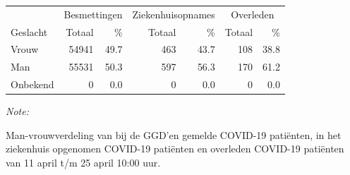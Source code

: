 \documentclass[
  english,
  man,floatsintext]{apa6}
\begin{document}
\begin{table}
\centering\begingroup\fontsize{11}{13}\selectfont

\begin{threeparttable}
\begin{tabular}{lrrrrrr}
\toprule
\multicolumn{1}{c}{ } & \multicolumn{2}{c}{Besmettingen} & \multicolumn{2}{c}{Ziekenhuisopnames} & \multicolumn{2}{c}{Overleden} \\
\cmidrule(l{3pt}r{3pt}){2-3} \cmidrule(l{3pt}r{3pt}){4-5} \cmidrule(l{3pt}r{3pt}){6-7}
Geslacht & Totaal & \% & Totaal & \% & Totaal & \%\\
\midrule
Vrouw & 54941 & 49.7 & 463 & 43.7 & 108 & 38.8\\
Man & 55531 & 50.3 & 597 & 56.3 & 170 & 61.2\\
Onbekend & 0 & 0.0 & 0 & 0.0 & 0 & 0.0\\
\bottomrule
\end{tabular}
\begin{tablenotes}
\item \textit{Note: } 
\item Man-vrouwverdeling van bij de GGD’en gemelde COVID-19 patiënten, in het ziekenhuis opgenomen COVID-19 patiënten en overleden COVID-19 patiënten van 11 april t/m 25 april 10:00 uur.
\end{tablenotes}
\end{threeparttable}
\endgroup{}
\end{table}
\newpage
\end{document}
